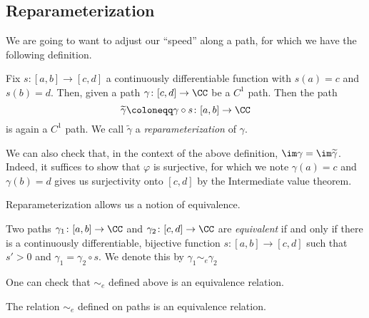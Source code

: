 \documentclass[../notes.tex]{subfiles}
\begin{document}
\subsection{Reparameterization}
We are going to want to adjust our ``speed'' along a path, for which we have the following definition.
\begin{definition}[Reparameterization]
	Fix $s\colon [a,b]\to[c,d]$ a continuously differentiable function with $s(a)=c$ and $s(b)=d$. Then, given a path $\gamma\colon [c,d]\to\CC$ be a $C^1$ path. Then the path
	\[\widetilde\gamma\coloneqq \gamma\circ s\colon [a,b]\to\CC\]
	is again a $C^1$ path. We call $\widetilde{\gamma}$ a \textit{reparameterization} of $\gamma$.
\end{definition}
\begin{remark}
	We can also check that, in the context of the above definition, $\im\gamma=\im\widetilde{\gamma}$. Indeed, it suffices to show that $\varphi$ is surjective, for which we note $\gamma(a)=c$ and $\gamma(b)=d$ gives us surjectivity onto $[c,d]$ by the Intermediate value theorem.
\end{remark}
Reparameterization allows us a notion of equivalence.
\begin{definition}[Equivalent]
	Two paths $\gamma_1\colon [a,b]\to\CC$ and $\gamma_2\colon [c,d]\to\CC$ are \textit{equivalent} if and only if there is a continuously differentiable, bijective function $s\colon [a,b]\to[c,d]$ such that $s'>0$ and $\gamma_1=\gamma_2\circ s$. We denote this by $\gamma_1\sim_e\gamma_2$
\end{definition}
One can check that $\sim_e$ defined above is an equivalence relation.
\begin{lemma}
	The relation $\sim_e$ defined on paths is an equivalence relation.
\end{lemma}
\end{document}
